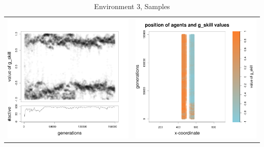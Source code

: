 \documentclass[a4paper,10pt]{article}
\begin{document}
\begin{table}[h!]
\caption{Environment 3, Samples}
 \centering
 \begin{tabular}{cc}
 \includegraphics[width=\imgSize]{images/5StaticEnv/Gplot5_staticEnv3}&\includegraphics[width=\imgSize]{images/5StaticEnv/Gplot5Static_staticEnv3}\\

\end{tabular}
\end{table}
\end{document}
